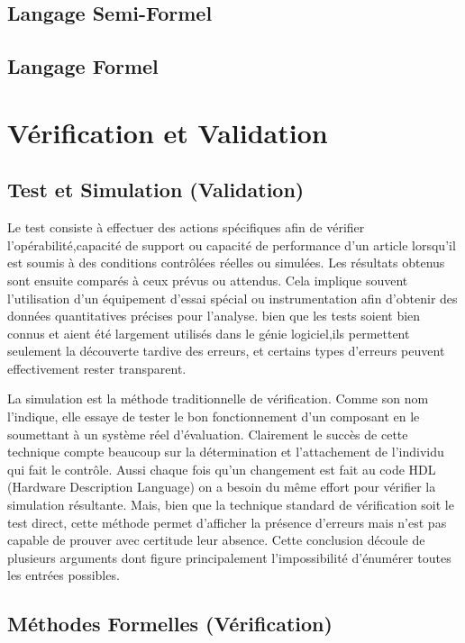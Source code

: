 \documentclass[french]{spimufcphdthesis}
\begin{document}
\subsection{Langage Semi-Formel}
\subsection{Langage Formel}

\section{Vérification et Validation}

\subsection{Test et Simulation (Validation)}

 Le test consiste à effectuer des actions spécifiques afin de vérifier l'opérabilité,capacité de support ou capacité de performance d'un article lorsqu'il est soumis à des conditions contrôlées réelles ou simulées. Les résultats obtenus sont ensuite comparés à ceux prévus ou attendus. Cela implique souvent l'utilisation d'un équipement d'essai spécial ou instrumentation afin d'obtenir des données quantitatives précises pour l'analyse.
bien que les tests soient bien connus et aient été largement utilisés dans le génie logiciel,ils permettent seulement la découverte tardive des erreurs, et certains types d'erreurs peuvent effectivement rester transparent.

 La simulation est  la  méthode traditionnelle  de  vérification.  Comme  son  nom l’indique,   elle    essaye   de tester   le   bon fonctionnement    d’un    composant    en    le soumettant   à  un   système   réel   d’évaluation. Clairement  le  succès    de  cette  technique  compte beaucoup    sur  la  détermination  et  l’attachement de  l’individu  qui  fait  le  contrôle.  Aussi  chaque fois  qu'un  changement  est  fait  au  code  HDL (Hardware Description Language) on a besoin du même   effort   pour   vérifier   la   simulation résultante.  Mais,  bien  que  la  technique  standard de  vérification  soit  le  test  direct,    cette  méthode permet d’afficher la présence d’erreurs mais n’est pas  capable  de  prouver  avec  certitude  leur absence.  Cette  conclusion  découle  de  plusieurs arguments dont figure principalement l’impossibilité   d’énumérer   toutes   les   entrées possibles.  

\subsection{Méthodes Formelles (Vérification)}
\end{document}
